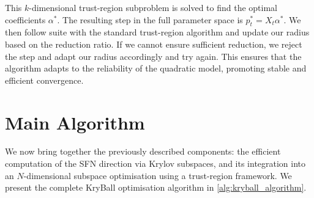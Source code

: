 This $k$-dimensional trust-region subproblem is solved to find the optimal coefficients $\alpha^*$. The resulting step in the full parameter space is $p_t^* = X_t \alpha^*$. We then follow suite with the standard trust-region algorithm and update our radius based on the reduction ratio. If we cannot ensure sufficient reduction, we reject the step and adapt our radius accordingly and try again. This ensures that the algorithm adapts to the reliability of the quadratic model, promoting stable and efficient convergence.


\section{Main Algorithm}
\label{sec:main_algorithm}

We now bring together the previously described components: the efficient computation of the SFN direction via Krylov subspaces, and its integration into an $N$-dimensional subspace optimisation using a trust-region framework. We present the complete KryBall optimisation algorithm in \cref{alg:kryball_algorithm}.

